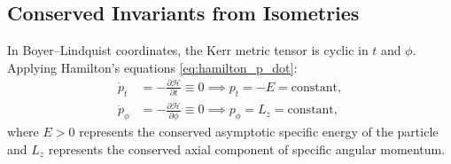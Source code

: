\subsection{Conserved Invariants from Isometries}
In Boyer--Lindquist coordinates, the Kerr metric tensor is cyclic in $t$ and $\phi$. Applying Hamilton's equations \eqref{eq:hamilton_p_dot}:
\begin{align}
    \dot{p}_t &= -\frac{\partial \mathcal{H}}{\partial t} \equiv 0 \implies p_t = -E = \text{constant}, \label{eq:conserved_energy} \\
    \dot{p}_\phi &= -\frac{\partial \mathcal{H}}{\partial \phi} \equiv 0 \implies p_\phi = L_z = \text{constant}, \label{eq:conserved_angmom}
\end{align}
where $E > 0$ represents the conserved asymptotic specific energy of the particle and $L_z$ represents the conserved axial component of specific angular momentum.

